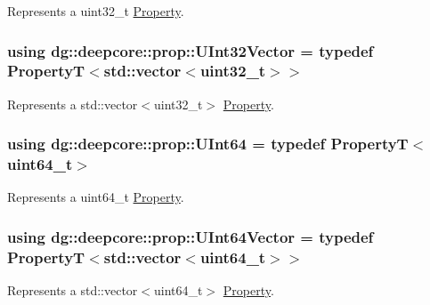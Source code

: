 Represents a {\ttfamily uint32\+\_\+t} \hyperlink{classdg_1_1deepcore_1_1_property}{Property}. 

\subsubsection[{\texorpdfstring{U\+Int32\+Vector}{UInt32Vector}}]{\setlength{\rightskip}{0pt plus 5cm}using {\bf dg\+::deepcore\+::prop\+::\+U\+Int32\+Vector} = typedef PropertyT$<$std\+::vector$<$uint32\+\_\+t$>$$>$}\hypertarget{group___process_properties_ga7cc75489500ae42aa3122aadd51d3441}{}\label{group___process_properties_ga7cc75489500ae42aa3122aadd51d3441}


Represents a {\ttfamily std\+::vector$<$uint32\+\_\+t$>$} \hyperlink{classdg_1_1deepcore_1_1_property}{Property}. 

\subsubsection[{\texorpdfstring{U\+Int64}{UInt64}}]{\setlength{\rightskip}{0pt plus 5cm}using {\bf dg\+::deepcore\+::prop\+::\+U\+Int64} = typedef PropertyT$<$uint64\+\_\+t$>$}\hypertarget{group___process_properties_gaf685658c29eaa69a10141e875f7330d7}{}\label{group___process_properties_gaf685658c29eaa69a10141e875f7330d7}


Represents a {\ttfamily uint64\+\_\+t} \hyperlink{classdg_1_1deepcore_1_1_property}{Property}. 

\subsubsection[{\texorpdfstring{U\+Int64\+Vector}{UInt64Vector}}]{\setlength{\rightskip}{0pt plus 5cm}using {\bf dg\+::deepcore\+::prop\+::\+U\+Int64\+Vector} = typedef PropertyT$<$std\+::vector$<$uint64\+\_\+t$>$$>$}\hypertarget{group___process_properties_gaea3792697747e659ee84e99497f27834}{}\label{group___process_properties_gaea3792697747e659ee84e99497f27834}


Represents a {\ttfamily std\+::vector$<$uint64\+\_\+t$>$} \hyperlink{classdg_1_1deepcore_1_1_property}{Property}. 

